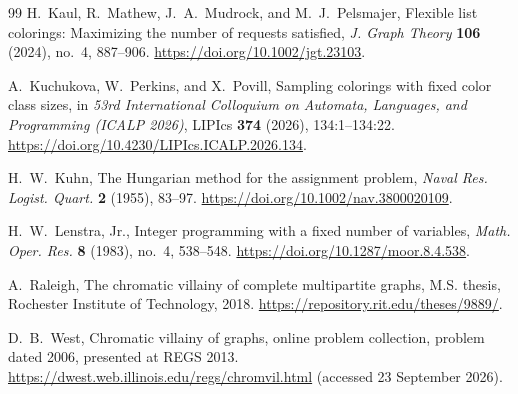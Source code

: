 \documentclass[11pt,reqno]{amsart}
\numberwithin{equation}{section}
\theoremstyle{definition}
\theoremstyle{remark}
\begin{document}
\begin{thebibliography}{99}
H.~Kaul, R.~Mathew, J.~A.~Mudrock, and M.~J.~Pelsmajer,
Flexible list colorings: Maximizing the number of requests satisfied,
\emph{J. Graph Theory} \textbf{106} (2024), no.~4, 887--906.
\url{https://doi.org/10.1002/jgt.23103}.

A.~Kuchukova, W.~Perkins, and X.~Povill,
Sampling colorings with fixed color class sizes,
in \emph{53rd International Colloquium on Automata, Languages, and Programming
(ICALP 2026)}, LIPIcs \textbf{374} (2026), 134:1--134:22.
\url{https://doi.org/10.4230/LIPIcs.ICALP.2026.134}.

H.~W.~Kuhn,
The Hungarian method for the assignment problem,
\emph{Naval Res. Logist. Quart.} \textbf{2} (1955), 83--97.
\url{https://doi.org/10.1002/nav.3800020109}.

H.~W.~Lenstra, Jr.,
Integer programming with a fixed number of variables,
\emph{Math. Oper. Res.} \textbf{8} (1983), no.~4, 538--548.
\url{https://doi.org/10.1287/moor.8.4.538}.

A.~Raleigh,
The chromatic villainy of complete multipartite graphs,
M.S. thesis, Rochester Institute of Technology, 2018.
\url{https://repository.rit.edu/theses/9889/}.

D.~B.~West,
Chromatic villainy of graphs,
online problem collection, problem dated 2006, presented at REGS 2013.
\url{https://dwest.web.illinois.edu/regs/chromvil.html}
(accessed 23 September 2026).

\end{thebibliography}
\end{document}
